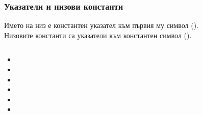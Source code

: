 \documentclass{beamer}
\begin{document}
\begin{frame}[fragile]
  \frametitle{Указатели и низови константи}
    \small

  \begin{afact}
    Името на низ е \alert{константен указател} към първия му символ ().\\\pause
    Низовите константи са \alert{указатели към константен символ} ().
  \end{afact}
  \pause
  \begin{columns}[T,onlytextwidth]
    \begin{column}{.6\textwidth}
      \begin{itemize}[<+->]
      \item {}
      \item {}
      \item {}
      \item {}
      \item {}
      \item {}
      \end{itemize}
    \end{column}
    \begin{column}{.4\textwidth}
    \end{column}
  \end{columns}
\end{frame}
\end{document}

